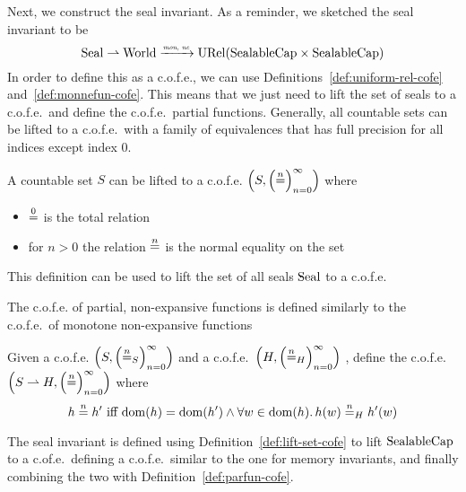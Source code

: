 \begin{jversion}
Next, we construct the seal invariant.
As a reminder, we sketched the seal invariant to be
\[
  \Seal \parfun \World \monnefun \URel{\SealableCaps\times\SealableCaps}
\]
In order to define this as a c.o.f.e., we can use Definitions~\ref{def:uniform-rel-cofe} and~\ref{def:monnefun-cofe}.
This means that we just need to lift the set of seals to a c.o.f.e.\ and define the c.o.f.e.\ partial functions.
Generally, all countable sets can be lifted to a c.o.f.e.\ with a family of equivalences that has full precision for all indices except index 0.
\begin{definition}[Sets to c.o.f.e.]
  \label{def:lift-set-cofe}
  A countable set $S$ can be lifted to a c.o.f.e. $\cofe{S}$ where
  \begin{itemize}
  \item $\nequal[0]$ is the total relation
  \item for $n > 0$ the relation $\nequal$ is the normal equality on the set
  \end{itemize}
\end{definition}
This definition can be used to lift the set of all seals $\Seal$ to a c.o.f.e.

The c.o.f.e. of partial, non-expansive functions is defined similarly to the c.o.f.e.\ of monotone non-expansive functions
\begin{definition}
\label{def:parfun-cofe}
  Given a c.o.f.e. $\left(S,\left(\nequal[n]_S\right)_{n=0}^{\infty}\right)$ and a c.o.f.e.\ $\left(H,\left(\nequal[n]_H\right)_{n=0}^{\infty}\right)$ , define the c.o.f.e.\ $\left(S \parfun H,\left(\nequal[n]\right)_{n=0}^{\infty} \right)$ where 
  \[
    h \nequal h' \text{ iff } \dom(h) = \dom(h') \wedge \forall w \in \dom(h) \ldotp h(w) \nequal_H h'(w)
  \]
\end{definition}
The seal invariant is defined using Definition~\ref{def:lift-set-cofe} to lift $\SealableCaps$ to a c.of.e.\, defining a c.o.f.e.\ similar to the one for memory invariants, and finally combining the two with Definition~\ref{def:parfun-cofe}.


\end{jversion}
